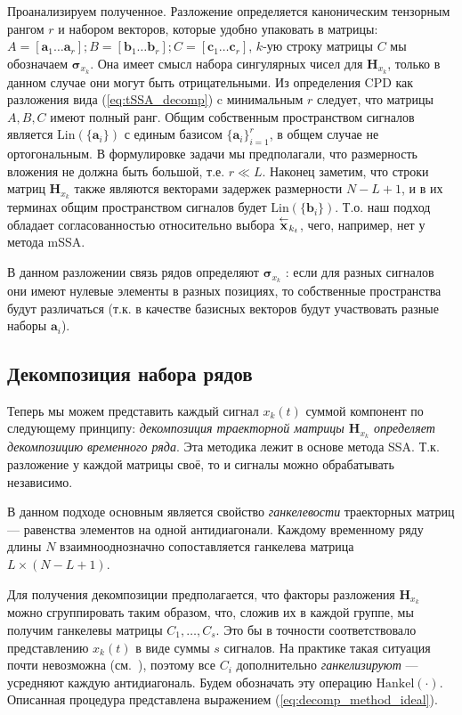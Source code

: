 	    	Проанализируем полученное. Разложение определяется каноническим тензорным рангом $ r $ и набором векторов, которые удобно упаковать в матрицы: $ A = [\mathbf{a}_1 \ldots \mathbf{a}_r]; B = [\mathbf{b}_1 \ldots \mathbf{b}_r]; C = [\mathbf{c}_1 \ldots \mathbf{c}_r] $, $ k $-ую строку матрицы $ C $ мы обозначаем $ \boldsymbol{\sigma}_{x_k} $. Она имеет смысл набора сингулярных чисел для $ \mathbf{H}_{x_k} $, только в данном случае они могут быть отрицательными. Из определения CPD как разложения вида (\ref{eq:tSSA_decomp}) c минимальным $ r $ следует, что матрицы $ A, B, C $ имеют полный ранг. Общим собственным пространством сигналов является $ \text{Lin}(\{\mathbf{a}_i\}) $ с единым базисом $ \{\mathbf{a}_i\}_{i = 1}^r $, в общем случае не ортогональным. В формулировке задачи мы предполагали, что размерность вложения не должна быть большой, т.е. $ r \ll L $. Наконец заметим, что строки матриц $ \mathbf{H}_{x_k} $ также являются векторами задержек размерности $ N - L + 1 $, и в их терминах общим пространством сигналов будет $ \text{Lin}(\{\mathbf{b}_i\}) $. Т.о. наш подход обладает согласованностью относительно выбора $ \overset{\leftarrow}{\mathbf{x}}_{k_t} $, чего, например, нет у метода mSSA.
	    	
	    	В данном разложении связь рядов определяют $ \boldsymbol{\sigma}_{x_k} $ : если для разных сигналов они имеют нулевые элементы в разных позициях, то собственные пространства будут различаться (т.к. в качестве базисных векторов будут участвовать разные наборы $ \mathbf{a}_i $).
	    	
	    \subsection*{Декомпозиция набора рядов}
	    
	    	Теперь мы можем представить каждый сигнал $ x_k(t) $ суммой компонент по следующему принципу: \emph{декомпозиция траекторной матрицы $ \mathbf{H}_{x_k} $ определяет декомпозицию временного ряда}. Эта методика лежит в основе метода SSA. Т.к. разложение у каждой матрицы своё, то и сигналы можно обрабатывать независимо.
	    	
	    	В данном подходе основным является свойство \emph{ганкелевости} траекторных матриц --- равенства элементов на одной антидиагонали. Каждому временному ряду длины $ N $ взаимнооднозначно сопоставляется ганкелева матрица $ L \times (N - L + 1) $.
	    	
	    	Для получения декомпозиции предполагается, что факторы разложения $ \mathbf{H}_{x_k} $ можно сгруппировать таким образом, что, сложив их в каждой группе, мы получим ганкелевы матрицы $ C_1, \ldots, C_s $. Это бы в точности соответствовало представлению $ x_k(t) $ в виде суммы $ s $ сигналов. На практике такая ситуация почти невозможна (см.~\cite{ecfb9dc578be43ae9ee8fc88b8ff9151}), поэтому все $ C_i $ дополнительно \emph{ганкелизируют} --- усредняют каждую антидиагональ. Будем обозначать эту операцию $ \text{Hankel}(\cdot) $. Описанная процедура представлена выражением (\ref{eq:decomp_method_ideal}).
	    	
